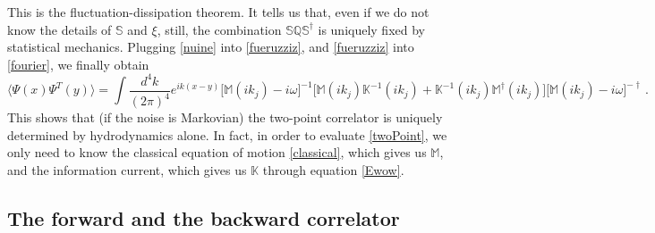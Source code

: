 \documentclass[a4paper, amsfonts, amssymb, amsmath, reprint, showkeys, nofootinbib, twoside,notitlepage,onecolumn]{revtex4-2}
\newcommand{\Ma}{{\mathbb{M}}}
\newcommand{\Sa}{{\mathbb{S}}}
\newcommand{\Qa}{{\mathbb{Q}}}
\newcommand{\Ka}{{\mathbb{K}}}
\theoremstyle{definition}
\begin{document}
This is the fluctuation-dissipation theorem. It tells us that, even if we do not know the details of $\Sa$ and $\xi$, still, the combination $\Sa\Qa\Sa^\dagger$ is uniquely fixed by statistical mechanics. Plugging \eqref{nuine} into \eqref{fueruzziz}, and \eqref{fueruzziz} into \eqref{fourier}, we finally obtain
\begin{equation}\label{twoPoint}
    \langle \Psi(x) \Psi^T(y)\rangle = \int \dfrac{d^4 k}{(2\pi)^4} e^{i k (x-y)} \big[\Ma(ik_j){-}i\omega\big]^{-1}\big[ \Ma(ik_j)\Ka^{-1}(ik_j){+}\Ka^{-1}(ik_j)\Ma^{\dagger}(ik_j)\big] \big[\Ma(ik_j){-}i\omega\big]^{-\dagger}  \, .
\end{equation}
This shows that (if the noise is Markovian) the two-point correlator is uniquely determined by hydrodynamics alone. In fact, in order to evaluate \eqref{twoPoint}, we only need to know the classical equation of motion \eqref{classical}, which gives us $\Ma$, and the information current, which gives us $\Ka$ through equation \eqref{Ewow}.


\subsection{The forward and the backward correlator}
\end{document}
